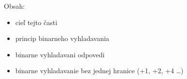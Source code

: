 




Obsah:
\begin{itemize}
    \item cieľ tejto časti
    \item princip binarneho vyhladavania
    \item binarne vyhladavani odpovedi
    \item binarne vyhladavanie bez jednej hranice (+1, +2, +4 \dots)
\end{itemize}


